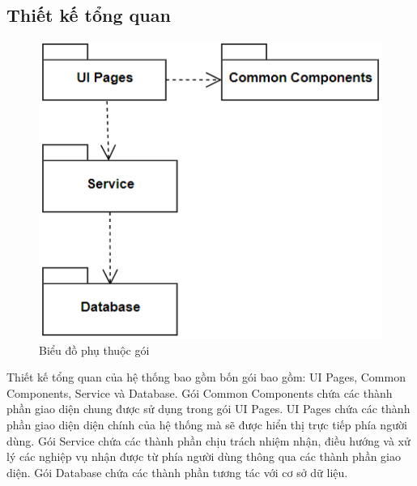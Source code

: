 \documentclass[../DoAn.tex]{subfiles}
\begin{document}
\subsection{Thiết kế tổng quan}
\begin{figure}[H]
    \centering
    \includegraphics{Hinhve/package.png}
    \caption{Biểu đồ phụ thuộc gói}
    \label{fig:Fig1}
\end{figure}
Thiết kế tổng quan của hệ thống bao gồm bốn gói bao gồm: UI Pages, Common Components, Service và Database. Gói Common Components chứa các thành phần giao diện chung được sử dụng trong gói UI Pages. UI Pages chứa các thành phần giao diện diện chính của hệ thống mà sẽ được hiển thị trực tiếp phía người dùng. Gói Service chứa các thành phần chịu trách nhiệm nhận, điều hướng và xử lý các nghiệp vụ nhận được từ phía người dùng thông qua các thành phần giao diện. Gói Database chứa các thành phần tương tác với cơ sở dữ liệu.
\newpage
\end{document}
